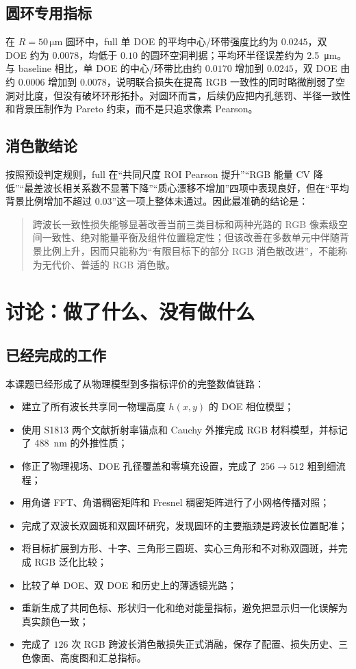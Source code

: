 \documentclass[UTF8,a4paper,12pt]{ctexart}
\newcommand{\um}{\si{\micro\meter}}
\begin{document}
\subsection{圆环专用指标}
在 $R=50\,\um$ 圆环中，full 单 DOE 的平均中心/环带强度比约为 $0.0245$，双 DOE 约为 $0.0078$，均低于 $0.10$ 的圆环空洞判据；平均环半径误差约为 \SI{2.5}{\micro\meter}。与 baseline 相比，单 DOE 的中心/环带比由约 $0.0170$ 增加到 $0.0245$，双 DOE 由约 $0.0006$ 增加到 $0.0078$，说明联合损失在提高 RGB 一致性的同时略微削弱了空洞对比度，但没有破坏环形拓扑。对圆环而言，后续仍应把内孔惩罚、半径一致性和背景压制作为 Pareto 约束，而不是只追求像素 Pearson。

\subsection{消色散结论}
按照预设判定规则，full 在“共同尺度 ROI Pearson 提升”“RGB 能量 CV 降低”“最差波长相关系数不显著下降”“质心漂移不增加”四项中表现良好，但在“平均背景比例增加不超过 $0.03$”这一项上整体未通过。因此最准确的结论是：
\begin{quote}
跨波长一致性损失能够显著改善当前三类目标和两种光路的 RGB 像素级空间一致性、绝对能量平衡及组件位置稳定性；但该改善在多数单元中伴随背景比例上升，因而只能称为“有限目标下的部分 RGB 消色散改进”，不能称为无代价、普适的 RGB 消色散。
\end{quote}

\section{讨论：做了什么、没有做什么}
\subsection{已经完成的工作}
本课题已经形成了从物理模型到多指标评价的完整数值链路：
\begin{itemize}
\item 建立了所有波长共享同一物理高度 $h(x,y)$ 的 DOE 相位模型；
\item 使用 S1813 两个文献折射率锚点和 Cauchy 外推完成 RGB 材料模型，并标记了 \SI{488}{nm} 的外推性质；
\item 修正了物理视场、DOE 孔径覆盖和零填充设置，完成了 $256\to512$ 粗到细流程；
\item 用角谱 FFT、角谱稠密矩阵和 Fresnel 稠密矩阵进行了小网格传播对照；
\item 完成了双波长双圆斑和双圆环研究，发现圆环的主要瓶颈是跨波长位置配准；
\item 将目标扩展到方形、十字、三角形三圆斑、实心三角形和不对称双圆斑，并完成 RGB 泛化比较；
\item 比较了单 DOE、双 DOE 和历史上的薄透镜光路；
\item 重新生成了共同色标、形状归一化和绝对能量指标，避免把显示归一化误解为真实颜色一致；
\item 完成了 $126$ 次 RGB 跨波长消色散损失正式消融，保存了配置、损失历史、三色像面、高度图和汇总指标。
\end{itemize}
\end{document}
